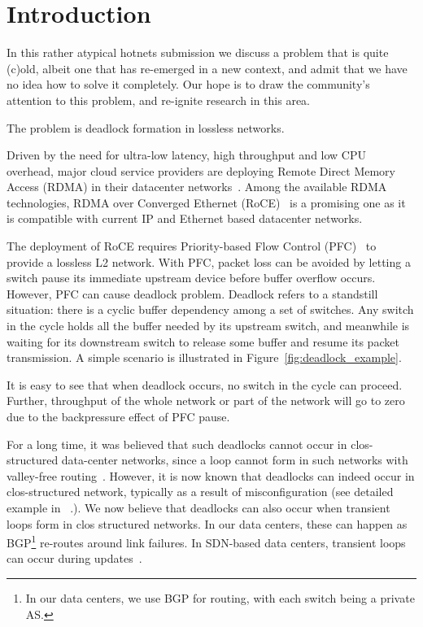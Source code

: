 \secspace
\section{Introduction}
\secspace
\label{sec:intro}

In this rather atypical hotnets submission we discuss a problem that is quite
(c)old, albeit one that has re-emerged in a new context, and admit that we have
no idea how to solve it completely. Our hope is to draw the community's
attention to this problem, and re-ignite research in this area.

The problem is deadlock formation in lossless networks.

Driven by the need for ultra-low latency, high throughput and low CPU overhead,
major cloud service providers are deploying Remote Direct Memory Access (RDMA) in
their datacenter networks~\cite{dcqcn,timely}. Among the
available RDMA technologies,  RDMA over Converged Ethernet (RoCE)~\cite{roce} is
a promising one as it is compatible with current IP and Ethernet based
datacenter networks.

The deployment of RoCE requires Priority-based Flow Control (PFC)~\cite{pfc} to
provide a lossless L2 network. With PFC, packet loss can be avoided by letting a
switch pause its immediate upstream device before buffer overflow occurs.
However, PFC can cause deadlock problem. Deadlock refers to a
standstill situation: there is a cyclic buffer dependency among a set of
switches. Any switch in the cycle holds all the buffer needed by its upstream
switch, and meanwhile is waiting for its downstream switch to release some
buffer and resume its packet transmission. A simple scenario is illustrated in
Figure~\ref{fig:deadlock_example}.

It is easy to see that when deadlock occurs, no switch in the cycle can proceed.
Further, throughput of the whole network or part of the network will go to zero
due to the backpressure effect of PFC pause. 

For a long time, it was believed that such deadlocks cannot occur in
clos-structured data-center networks, since a loop cannot form in such networks
with valley-free routing~\cite{dcqcn}.  However, it is now known that deadlocks
can indeed occur in clos-structured network, typically as a result of
misconfiguration (see detailed example in ~\cite{rdmascale}.). We now believe
that deadlocks can also occur when transient loops form in clos structured
networks. In our data centers, these can happen as BGP\footnote{In our data
centers, we use BGP for routing, with each switch being a private AS.} re-routes
around link failures. In SDN-based data centers, transient loops can occur
during updates~\cite{dionysus}.

